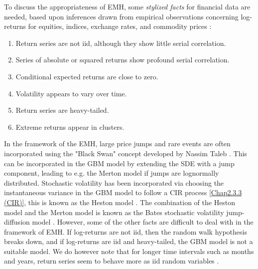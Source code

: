 To discuss the appropriateness of EMH, some \textit{stylized facts} for financial data are needed, based upon inferences drawn from empirical observations concerning log-returns for equities, indices, exchange rates, and commodity prices \citep{mcneilquantitative}:
\begin{enumerate}\label{Chap7 stylized}
	\item Return series are not iid, although they show little serial correlation.
	\item Series of absolute or squared returns show profound serial correlation.
	\item Conditional expected returns are close to zero.
	\item Volatility appears to vary over time.
	\item Return series are heavy-tailed.
	\item Extreme returns appear in clusters. 
\end{enumerate}
In the framework of the EMH, large price jumps and rare events are often incorporated using the "Black Swan" concept developed by Nassim Taleb \citep{taleb2010black}.
This can be incorporated in the GBM model by extending the SDE with a jump component, leading to e.g. the Merton model if jumps are lognormally distributed.
Stochastic volatility has been incorporated via choosing the instantaneous variance in the GBM model to follow a CIR process \eqref{Chap2.3.3 (CIR)}, this is known as the Heston model \citep{heston1993closed}.
The combination of the Heston model and the Merton model is known as the Bates stochastic volatility jump-diffusion model \citep{bates1996jumps}.
However, some of the other facts are difficult to deal with in the framework of EMH.
If log-returns are not iid, then the random walk hypothesis breaks down, and if log-returns are iid and heavy-tailed, the GBM model is not a suitable model.
We do however note that for longer time intervals such as months and years, return series seem to behave more as iid random variables \citep{mcneilquantitative}.

